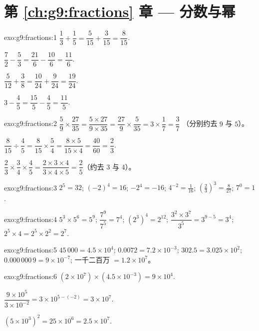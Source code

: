 \section*{第 \ref{ch:g9:fractions} 章 --- 分数与幂}

\begin{solution}{exo:g9:fractions:1}
$\dfrac13 + \dfrac15 = \dfrac{5}{15} + \dfrac{3}{15} = \dfrac{8}{15}$.

$\dfrac72 - \dfrac53 = \dfrac{21}{6} - \dfrac{10}{6} = \dfrac{11}{6}$.

$\dfrac{5}{12} + \dfrac38 = \dfrac{10}{24} + \dfrac{9}{24} =
\dfrac{19}{24}$.

$3 - \dfrac45 = \dfrac{15}{5} - \dfrac45 = \dfrac{11}{5}$.
\end{solution}

\begin{solution}{exo:g9:fractions:2}
$\dfrac59 \times \dfrac{27}{35} = \dfrac{5 \times 27}{9 \times 35}
= \dfrac{27}{9} \times \dfrac{5}{35} = 3 \times \dfrac17 = \dfrac37$
（分别约去 $9$ 与 $5$）。

$\dfrac{8}{15} \div \dfrac45 = \dfrac{8}{15} \times \dfrac54
= \dfrac{8 \times 5}{15 \times 4} = \dfrac{40}{60} = \dfrac23$.

$\dfrac23 \times \dfrac34 \times \dfrac45 = \dfrac{2 \times 3 \times 4}
{3 \times 4 \times 5} = \dfrac25$（约去 $3$ 与 $4$）。
\end{solution}

\begin{solution}{exo:g9:fractions:3}
$2^5 = 32$; \quad $(-2)^4 = 16$; \quad $-2^4 = -16$; \quad
$4^{-2} = \frac{1}{16}$; \quad
$\left(\frac23\right)^3 = \frac{8}{27}$; \quad $7^0 = 1$.
\end{solution}

\begin{solution}{exo:g9:fractions:4}
$5^3 \times 5^6 = 5^9$; \quad $\dfrac{7^9}{7^5} = 7^4$; \quad
$\left(2^3\right)^4 = 2^{12}$; \quad
$\dfrac{3^2 \times 3^7}{3^5} = 3^{9-5} = 3^4$; \quad
$2^5 \times 4 = 2^5 \times 2^2 = 2^7$.
\end{solution}

\begin{solution}{exo:g9:fractions:5}
$45\,000 = 4.5 \times 10^4$; \quad
$0.0072 = 7.2 \times 10^{-3}$; \quad
$302.5 = 3.025 \times 10^2$; \quad
$0.000\,000\,9 = 9 \times 10^{-7}$; \quad
一千二百万 $= 1.2 \times 10^7$。
\end{solution}

\begin{solution}{exo:g9:fractions:6}
$(2 \times 10^7) \times (4.5 \times 10^{-3}) = 9 \times 10^{4}$.

$\dfrac{9 \times 10^5}{3 \times 10^{-2}} = 3 \times 10^{5 - (-2)}
= 3 \times 10^7$.

$(5 \times 10^3)^2 = 25 \times 10^6 = 2.5 \times 10^7$.
\end{solution}


